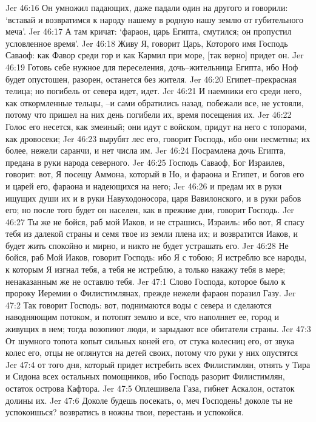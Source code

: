 Jer 46:16  Он умножил падающих, даже падали один на другого и говорили: `вставай и возвратимся к народу нашему в родную нашу землю от губительного меча'.
Jer 46:17  А там кричат: `фараон, царь Египта, смутился; он пропустил условленное время'.
Jer 46:18  Живу Я, говорит Царь, Которого имя Господь Саваоф: как Фавор среди гор и как Кармил при море, [так верно] придет он.
Jer 46:19  Готовь себе нужное для переселения, дочь--жительница Египта, ибо Ноф будет опустошен, разорен, останется без жителя.
Jer 46:20  Египет--прекрасная телица; но погибель от севера идет, идет.
Jer 46:21  И наемники его среди него, как откормленные тельцы, --и сами обратились назад, побежали все, не устояли, потому что пришел на них день погибели их, время посещения их.
Jer 46:22  Голос его несется, как змеиный; они идут с войском, придут на него с топорами, как дровосеки;
Jer 46:23  вырубят лес его, говорит Господь, ибо они несметны; их более, нежели саранчи, и нет числа им.
Jer 46:24  Посрамлена дочь Египта, предана в руки народа северного.
Jer 46:25  Господь Саваоф, Бог Израилев, говорит: вот, Я посещу Аммона, который в Но, и фараона и Египет, и богов его и царей его, фараона и надеющихся на него;
Jer 46:26  и предам их в руки ищущих души их и в руки Навуходоносора, царя Вавилонского, и в руки рабов его; но после того будет он населен, как в прежние дни, говорит Господь.
Jer 46:27  Ты же не бойся, раб мой Иаков, и не страшись, Израиль: ибо вот, Я спасу тебя из далекой страны и семя твое из земли плена их; и возвратится Иаков, и будет жить спокойно и мирно, и никто не будет устрашать его.
Jer 46:28  Не бойся, раб Мой Иаков, говорит Господь: ибо Я с тобою; Я истреблю все народы, к которым Я изгнал тебя, а тебя не истреблю, а только накажу тебя в мере; ненаказанным же не оставлю тебя.
Jer 47:1  Слово Господа, которое было к пророку Иеремии о Филистимлянах, прежде нежели фараон поразил Газу.
Jer 47:2  Так говорит Господь: вот, поднимаются воды с севера и сделаются наводняющим потоком, и потопят землю и все, что наполняет ее, город и живущих в нем; тогда возопиют люди, и зарыдают все обитатели страны.
Jer 47:3  От шумного топота копыт сильных коней его, от стука колесниц его, от звука колес его, отцы не оглянутся на детей своих, потому что руки у них опустятся
Jer 47:4  от того дня, который придет истребить всех Филистимлян, отнять у Тира и Сидона всех остальных помощников, ибо Господь разорит Филистимлян, остаток острова Кафтора.
Jer 47:5  Оплешивела Газа, гибнет Аскалон, остаток долины их.
Jer 47:6  Доколе будешь посекать, о, меч Господень! доколе ты не успокоишься? возвратись в ножны твои, перестань и успокойся.
